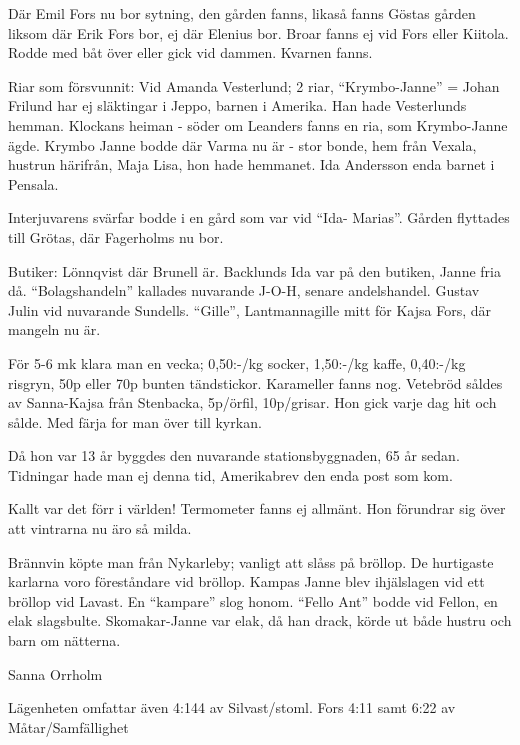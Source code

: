 Där Emil Fors nu bor sytning, den gården fanns, likaså fanns Göstas gården liksom där Erik Fors bor, ej där Elenius bor.
Broar fanns ej vid Fors eller Kiitola. Rodde med båt över eller gick vid dammen. Kvarnen fanns.

Riar som försvunnit: Vid Amanda Vesterlund; 2 riar,  ``Krymbo-Janne'' = Johan Frilund har ej släktingar i Jeppo, barnen i Amerika. Han hade Vesterlunds hemman. Klockans heiman - söder om Leanders fanns en ria, som Krymbo-Janne ägde. Krymbo Janne bodde där Varma nu är - stor bonde, hem från Vexala, hustrun härifrån, Maja Lisa, hon hade hemmanet. Ida Andersson enda barnet i Pensala.

Interjuvarens svärfar bodde i en gård som var vid ``Ida- Marias''. Gården flyttades till Grötas, där Fagerholms nu bor.

Butiker: Lönnqvist där Brunell är. Backlunds Ida var på den butiken, Janne fria då. ``Bolagshandeln'' kallades nuvarande J-O-H, senare andelshandel. Gustav Julin vid nuvarande Sundells.  ``Gille'', Lantmannagille mitt för Kajsa Fors, där mangeln nu är.

För 5-6 mk klara man en vecka; 0,50:-/kg socker, 1,50:-/kg kaffe, 0,40:-/kg risgryn, 50p eller 70p bunten tändstickor. Karameller fanns nog. Vetebröd såldes av Sanna-Kajsa från Stenbacka, 5p/örfil, 10p/grisar. Hon gick varje dag hit och sålde. Med färja for man över till kyrkan.

Då hon var 13 år byggdes den nuvarande stationsbyggnaden, 65 år sedan. Tidningar hade man ej denna tid, Amerikabrev den enda post som kom.

Kallt var det förr i världen! Termometer fanns ej allmänt. Hon förundrar sig över att vintrarna nu äro så milda.

Brännvin köpte man från Nykarleby; vanligt att slåss på bröllop. De hurtigaste karlarna voro föreståndare vid bröllop. Kampas Janne blev ihjälslagen vid ett bröllop vid Lavast. En ``kampare'' slog honom. ``Fello Ant''  bodde vid Fellon, en elak slagsbulte. Skomakar-Janne var elak, då han drack, körde ut både hustru och barn om nätterna.

Sanna Orrholm




Lägenheten omfattar även  4:144 av Silvast/stoml. Fors 4:11	samt  6:22 av Måtar/Samfällighet



